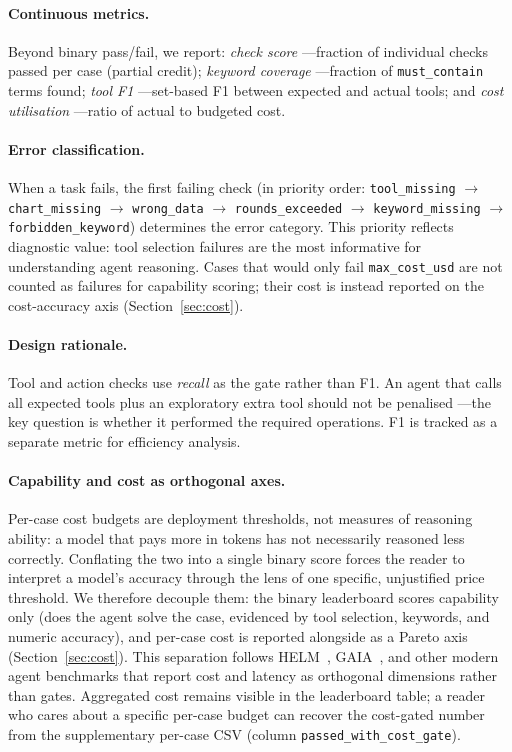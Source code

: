 \documentclass[sigconf]{acmart}
\begin{document}
\paragraph{Continuous metrics.} Beyond binary pass/fail, we report: \emph{check score} ---fraction of individual checks passed per case (partial credit); \emph{keyword coverage} ---fraction of \texttt{must\_contain} terms found; \emph{tool F1} ---set-based F1 between expected and actual tools; and \emph{cost utilisation} ---ratio of actual to budgeted cost.

\paragraph{Error classification.} When a task fails, the first failing check (in priority order: \texttt{tool\_missing} $\to$ \texttt{chart\_missing} $\to$ \texttt{wrong\_data} $\to$ \texttt{rounds\_exceeded} $\to$ \texttt{keyword\_missing} $\to$ \texttt{forbidden\_keyword}) determines the error category. This priority reflects diagnostic value: tool selection failures are the most informative for understanding agent reasoning. Cases that would only fail \texttt{max\_cost\_usd} are not counted as failures for capability scoring; their cost is instead reported on the cost-accuracy axis (Section~\ref{sec:cost}).

\paragraph{Design rationale.} Tool and action checks use \emph{recall} as the gate rather than F1. An agent that calls all expected tools plus an exploratory extra tool should not be penalised ---the key question is whether it performed the required operations. F1 is tracked as a separate metric for efficiency analysis.

\paragraph{Capability and cost as orthogonal axes.} Per-case cost budgets are deployment thresholds, not measures of reasoning ability: a model that pays more in tokens has not necessarily reasoned less correctly. Conflating the two into a single binary score forces the reader to interpret a model's accuracy through the lens of one specific, unjustified price threshold. We therefore decouple them: the binary leaderboard scores capability only (does the agent solve the case, evidenced by tool selection, keywords, and numeric accuracy), and per-case cost is reported alongside as a Pareto axis (Section~\ref{sec:cost}). This separation follows HELM~\citep{liang2023helm}, GAIA~\citep{mialon2023gaia}, and other modern agent benchmarks that report cost and latency as orthogonal dimensions rather than gates. Aggregated cost remains visible in the leaderboard table; a reader who cares about a specific per-case budget can recover the cost-gated number from the supplementary per-case CSV (column \texttt{passed\_with\_cost\_gate}).
\end{document}
